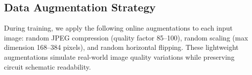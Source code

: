 \subsection{Data Augmentation Strategy}
During training, we apply the following online augmentations to each input image: random JPEG compression (quality factor 85--100), random scaling (max dimension 168--384 pixels), and random horizontal flipping. These lightweight augmentations simulate real-world image quality variations while preserving circuit schematic readability.

